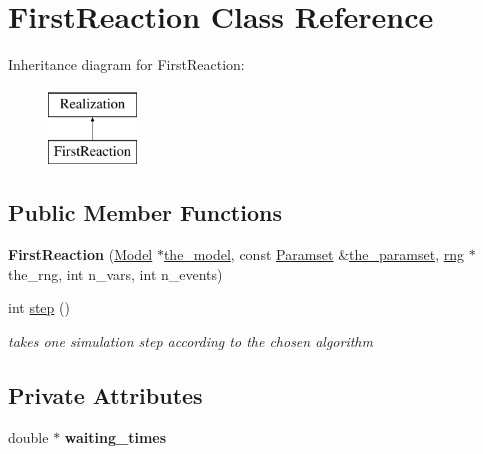 \hypertarget{class_first_reaction}{}\section{First\+Reaction Class Reference}
\label{class_first_reaction}
Inheritance diagram for First\+Reaction\+:\begin{figure}[H]
\begin{center}
\leavevmode
\includegraphics[height=2.000000cm]{class_first_reaction}
\end{center}
\end{figure}
\subsection*{Public Member Functions}
\begin{DoxyCompactItemize}
\item 
\mbox{\label{class_first_reaction_a5122d48f6ecbe17a75cecd41b06ac4a2}} 
{\bfseries First\+Reaction} (\hyperlink{class_model}{Model} $\ast$\hyperlink{class_realization_a47ec1d062b8caee874b08c1a17d6aeeb}{the\+\_\+model}, const \hyperlink{class_paramset}{Paramset} \&\hyperlink{class_realization_a119bb29de88929bc51bc1b329473a94b}{the\+\_\+paramset}, \hyperlink{classrng}{rng} $\ast$the\+\_\+rng, int n\+\_\+vars, int n\+\_\+events)
\item 
\mbox{\label{class_first_reaction_aed63c3c95d20b2ad557dabb6c5376a73}} 
int \hyperlink{class_first_reaction_aed63c3c95d20b2ad557dabb6c5376a73}{step} ()
\begin{DoxyCompactList}\small\item\em takes one simulation step according to the chosen algorithm \end{DoxyCompactList}\end{DoxyCompactItemize}
\subsection*{Private Attributes}
\begin{DoxyCompactItemize}
\item 
\mbox{\label{class_first_reaction_adef190a1cb589cc8317b469f94cd6ad4}} 
double $\ast$ {\bfseries waiting\+\_\+times}
\end{DoxyCompactItemize}
